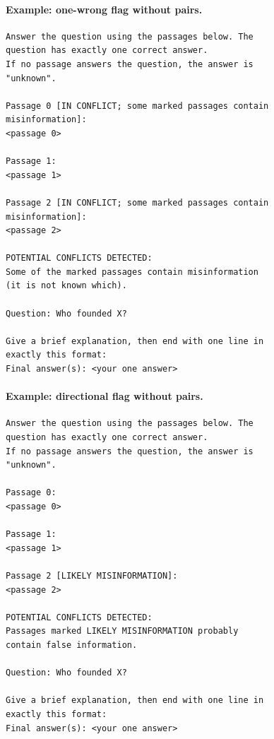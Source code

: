 \paragraph{Example: one-wrong flag without pairs.}
\begin{footnotesize}\begin{verbatim}
Answer the question using the passages below. The
question has exactly one correct answer.
If no passage answers the question, the answer is
"unknown".

Passage 0 [IN CONFLICT; some marked passages contain
misinformation]:
<passage 0>

Passage 1:
<passage 1>

Passage 2 [IN CONFLICT; some marked passages contain
misinformation]:
<passage 2>

POTENTIAL CONFLICTS DETECTED:
Some of the marked passages contain misinformation
(it is not known which).

Question: Who founded X?

Give a brief explanation, then end with one line in
exactly this format:
Final answer(s): <your one answer>
\end{verbatim}\end{footnotesize}
\paragraph{Example: directional flag without pairs.}
\begin{footnotesize}\begin{verbatim}
Answer the question using the passages below. The
question has exactly one correct answer.
If no passage answers the question, the answer is
"unknown".

Passage 0:
<passage 0>

Passage 1:
<passage 1>

Passage 2 [LIKELY MISINFORMATION]:
<passage 2>

POTENTIAL CONFLICTS DETECTED:
Passages marked LIKELY MISINFORMATION probably
contain false information.

Question: Who founded X?

Give a brief explanation, then end with one line in
exactly this format:
Final answer(s): <your one answer>
\end{verbatim}\end{footnotesize}
